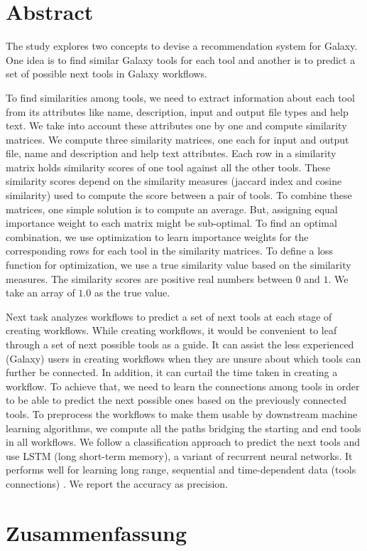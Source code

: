 \chapter*{Abstract}
The study explores two concepts to devise a recommendation system for Galaxy. One idea is to find similar Galaxy tools for each tool and another is to predict a set of possible next tools in Galaxy workflows.

To find similarities among tools, we need to extract information about each tool from its attributes like name, description, input and output file types and help text. We take into account these attributes one by one and compute similarity matrices. We compute three similarity matrices, one each for input and output file, name and description and help text attributes. Each row in a similarity matrix holds similarity scores of one tool against all the other tools. These similarity scores depend on the similarity measures (jaccard index and cosine similarity) used to compute the score between a pair of tools. To combine these matrices, one simple solution is to compute an average. But, assigning equal importance weight to each matrix might be sub-optimal. To find an optimal combination, we use optimization to learn importance weights for the corresponding rows for each tool in the similarity matrices. To define a loss function for optimization, we use a true similarity value based on the similarity measures. The similarity scores are positive real numbers between $0$ and $1$. We take an array of $1.0$ as the true value.

Next task analyzes workflows to predict a set of next tools at each stage of creating workflows. While creating workflows, it would be convenient to leaf through a set of next possible tools as a guide. It can assist the less experienced (Galaxy) users in creating workflows when they are unsure about which tools can further be connected. In addition, it can curtail the time taken in creating a workflow. To achieve that, we need to learn the connections among tools in order to be able to predict the next possible ones based on the previously connected tools. To preprocess the workflows to make them usable by downstream machine learning algorithms, we compute all the paths bridging the starting and end tools in all workflows. We follow a classification approach to predict the next tools and use LSTM (long short-term memory), a variant of recurrent neural networks. It performs well for learning long range, sequential and time-dependent data (tools connections) \cite{LiptonKEW15, SakSB14}. We report the accuracy as precision.


\chapter*{Zusammenfassung}

